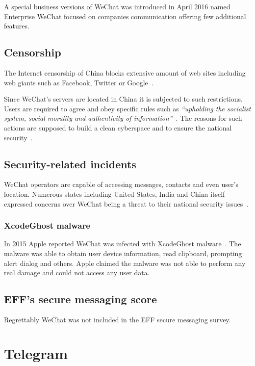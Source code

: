 \documentclass[thesis=M,english]{FITthesis}[2012/10/20]
\begin{document}
A special business versions of WeChat was introduced in April 2016 named Enterprise WeChat focused on companies communication offering few additional features.

\subsection{Censorship}

The Internet censorship of China blocks extensive amount of web sites including web giants such as Facebook, Twitter or Google~\cite{china-twitter,china-facebook}.

Since WeChat's servers are located in China it is subjected to such restrictions. Users are required to agree and obey specific rules such as \emph{``upholding the socialist system, social morality and authenticity of information''}~\cite{china-imblocking}. The reasons for such actions are supposed to build a clean cyberspace and to ensure the national security~\cite{china-blocking2}.

\subsection{Security-related incidents}

WeChat operators are capable of accessing messages, contacts and even user's location. Numerous states including United States, India and China itself expressed concerns over WeChat being a threat to their national security issues~\cite{wechat-states}.

\subsubsection{XcodeGhost malware}

In 2015 Apple reported WeChat was infected with XcodeGhost malware~\cite{wechat-xcodemalware}. The malware was able to obtain user device information, read clipboard, prompting alert dialog and others. Apple claimed the malware was not able to perform any real damage and could not access any user data. 

\subsection{EFF's secure messaging score}

Regrettably WeChat was not included in the EFF secure messaging survey.


\section{Telegram}
\end{document}
